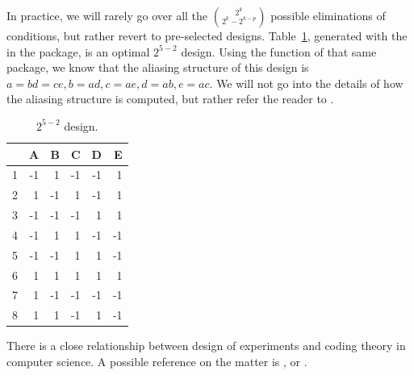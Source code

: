 In practice, we will rarely go over all the $\binom{2^k}{2^k-2^{k-p}}$ possible eliminations of conditions, but rather revert to pre-selected designs. 
Table~\ref{tab:partial_factorial_ii}, generated with the  in the  \R package, is an optimal $2^{5-2}$ design.
Using the  function of that same package, we know that the aliasing structure of this design is
$a=bd=ce, b=ad, c=ae, d=ab, e=ac$.
We will not go into the details of how the aliasing structure is computed, but rather refer the reader to \cite{cox_theory_2000}.
\begin{table}[ht]
\centering
\begin{tabular}{rrrrrr}
  \hline
 & A & B & C & D & E \\ 
  \hline
1 & -1 & 1 & -1 & -1 & 1 \\ 
  2 & 1 & -1 & 1 & -1 & 1 \\ 
  3 & -1 & -1 & -1 & 1 & 1 \\ 
  4 & -1 & 1 & 1 & -1 & -1 \\ 
  5 & -1 & -1 & 1 & 1 & -1 \\ 
  6 & 1 & 1 & 1 & 1 & 1 \\ 
  7 & 1 & -1 & -1 & -1 & -1 \\ 
  8 & 1 & 1 & -1 & 1 & -1 \\ 
   \hline
\end{tabular}
\caption[Fractional Factorial Design]{$2^{5-2}$ design.}
\label{tab:partial_factorial_ii}
\end{table}





\begin{extra}
There is a close relationship between design of experiments and coding theory in computer science. 
A possible reference on the matter is \cite{hill_first_1986}, or \cite{hedayat_orthogonal_1999}.
\end{extra}


%
%






